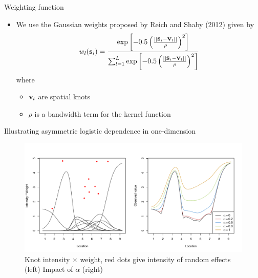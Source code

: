 \documentclass{beamer}
\begin{document}
\begin{frame}{Weighting function}
  \begin{itemize} \setlength{\itemsep}{0.5em}
    \item We use the Gaussian weights proposed by Reich and Shaby (2012) given by
    \footnotesize{
    \begin{align*}
      w_l(\mbox{\bf s}_i) = \frac{ \exp\left[ -0.5 \left( \frac{ || \mbox{\bf s}_i - \mbox{\bf v}_l || }{ \rho} \right)^2 \right]}{ \sum_{l = 1}^L \exp\left[ -0.5 \left( \frac{ || \mbox{\bf s}_i - \mbox{\bf v}_l || }{ \rho} \right)^2 \right] }
    \end{align*}
    }
    where
    \begin{itemize}
      \item $\mbox{\bf v}_l$ are spatial knots
      \item $\rho$ is a bandwidth term for the kernel function
    \end{itemize}
  \end{itemize}
\end{frame}

\begin{frame}{Illustrating asymmetric logistic dependence in one-dimension}
  \centering
  \begin{figure}
    \includegraphics[width=\linewidth, trim=0 0.5in 0 0]{./plots/max-stable.pdf}
    \caption{Knot intensity $\times$ weight, red dots give intensity of random effects (left) Impact of $\alpha$ (right)}
   \end{figure}
\end{frame}
\end{document}
